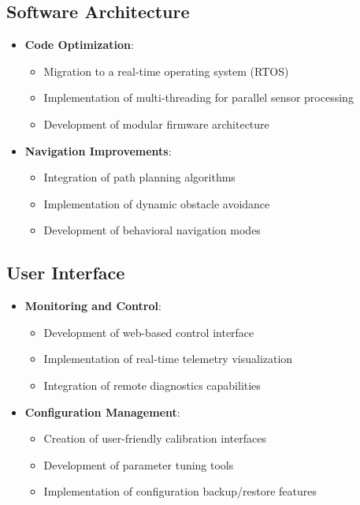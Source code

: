 \documentclass{article}
\begin{document}
\subsection{Software Architecture}
\begin{itemize}
    \item \textbf{Code Optimization}:
        \begin{itemize}
            \item Migration to a real-time operating system (RTOS)
            \item Implementation of multi-threading for parallel sensor processing
            \item Development of modular firmware architecture
        \end{itemize}
    
    \item \textbf{Navigation Improvements}:
        \begin{itemize}
            \item Integration of path planning algorithms
            \item Implementation of dynamic obstacle avoidance
            \item Development of behavioral navigation modes
        \end{itemize}
\end{itemize}

\subsection{User Interface}
\begin{itemize}
    \item \textbf{Monitoring and Control}:
        \begin{itemize}
            \item Development of web-based control interface
            \item Implementation of real-time telemetry visualization
            \item Integration of remote diagnostics capabilities
        \end{itemize}
    
    \item \textbf{Configuration Management}:
        \begin{itemize}
            \item Creation of user-friendly calibration interfaces
            \item Development of parameter tuning tools
            \item Implementation of configuration backup/restore features
        \end{itemize}
\end{itemize}
\end{document}
